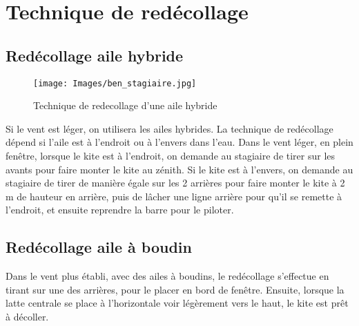 \documentclass[11pt,a4paper]{report}
\begin{document}



\chapter{Technique de redécollage \label{redecollage}}
\section{Redécollage aile hybride}
\begin{figure}[h]
\centering
\texttt{[image: Images/ben\_stagiaire.jpg]}
\caption{Technique de redecollage d'une aile hybride} 
\end{figure}

Si le vent est léger, on utilisera les ailes hybrides. La technique
de redécollage dépend si l'aile est à l'endroit ou à l'envers dans l'eau.
Dans le vent léger, en plein fen\^etre, lorsque
le kite est à l'endroit, on demande au stagiaire de tirer  sur les avants
pour faire monter le kite au zénith. 
Si le kite est à l'envers, on demande au stagiaire de tirer de manière
égale sur les 2 arrières pour faire monter le kite à 2 m de hauteur en arrière, 
puis de lâcher une ligne arrière pour qu'il se remette à l'endroit,
et ensuite reprendre la barre pour le piloter.

\section{Redécollage aile à boudin}
Dans le vent plus établi, avec des ailes à boudins, le redécollage s'effectue
en tirant sur une des arrières, pour le placer en bord de fenêtre.
Ensuite, lorsque la latte centrale se place à l'horizontale voir légèrement
vers le haut, le kite est pr\^et à décoller.


\end{document}
